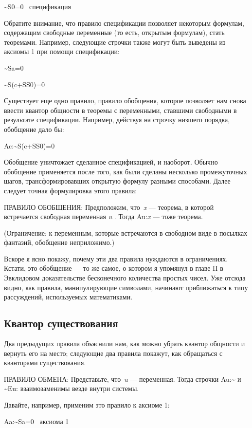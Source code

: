 \documentclass[../main.tex]{subfiles}
\begin{document}
\textasciitilde S0=0~ спецификация

Обратите внимание, что правило спецификации позволяет некоторым формулам, содержащим свободные переменные (то есть, открытым формулам), стать теоремами. Например, следующие строчки также могут быть выведены из аксиомы 1 при помощи спецификации:

\textasciitilde Sa=0

\textasciitilde S(c+SS0)=0

Существует еще одно правило, правило обобщения, которое позволяет нам снова ввести квантор общности в теоремы с переменными, ставшими свободными в результате спецификации. Например, действуя на строчку низшего порядка, обобщение дало бы:

Ac:\textasciitilde S(c+SS0)=0

Обобщение уничтожает сделанное спецификацией, и наоборот. Обычно обобщение применяется после того, как были сделаны несколько промежуточных шагов, трансформировавших открытую формулу разными способами. Далее следует точная формулировка этого правила:

ПРАВИЛО ОБОБЩЕНИЯ: Предположим, что~\emph{x} --- теорема, в которой встречается свободная переменная \emph{u} . Тогда Au:\emph{x} --- тоже теорема.

(Ограничение: к переменным, которые встречаются в свободном виде в посылках фантазий, обобщение неприложимо.)

Вскоре я ясно покажу, почему эти два правила нуждаются в ограничениях. Кстати, это обобщение --- то же самое, о котором я упомянул в главе II в Эвклидовом доказательстве бесконечного количества простых чисел. Уже отсюда видно, как правила, манипулирующие символами, начинают приближаться к типу рассуждений, используемых математиками.


\subsection{Квантор существования}

Два предыдущих правила объяснили нам, как можно убрать квантор общности и вернуть его на место; следующие два правила покажут, как обращаться с кванторами существования.

ПРАВИЛО ОБМЕНА: Представьте, что~\emph{u} --- переменная. Тогда строчки Au:\textasciitilde{} и \textasciitilde Eu: взаимозаменимы везде внутри системы.

Давайте, например, применим это правило к аксиоме 1:

Aa:\textasciitilde Sa=0~ аксиома 1
\end{document}
